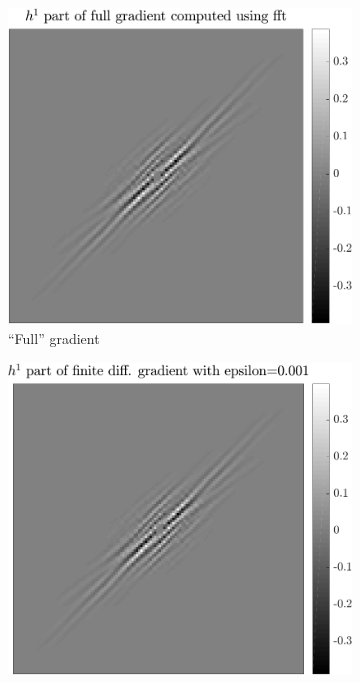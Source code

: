 \begin{figure}[!ht]\centering
\begin{subfigure}[b]{0.30\textwidth}\centering
\includegraphics[width=\textwidth]{figures/verif_gradient/gradient.pdf}
\caption{“Full” gradient}\label{fig_verif_gradient-grad}
\end{subfigure}
\begin{subfigure}[b]{0.30\textwidth}\centering
\includegraphics[width=\textwidth]{figures/verif_gradient/finite-diff.pdf}

\end{subfigure}
\end{figure}
